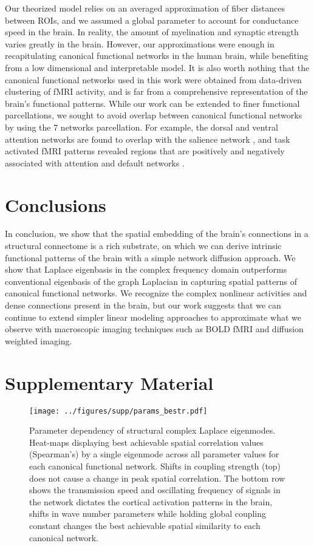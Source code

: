 \documentclass{article}
\begin{document}
Our theorized model relies on an averaged approximation of fiber distances between ROIs, and we assumed a global parameter to account for conductance speed in the brain. In reality, the amount of myelination and synaptic strength varies greatly in the brain. However, our approximations were enough in recapitulating canonical functional networks in the human brain, while benefiting from a low dimensional and interpretable model. It is also worth nothing that the canonical functional networks used in this work were obtained from data-driven clustering of fMRI activity, and is far from a comprehensive representation of the brain's functional patterns. While our work can be extended to finer functional parcellations, we sought to avoid overlap between canonical functional networks by using the 7 networks parcellation. For example, the dorsal and ventral attention networks are found to overlap with the salience network \cite{seeley_dissociable_2007}, and task activated fMRI patterns revealed regions that are positively and negatively associated with attention and default networks \cite{fox_human_2005}. 

\section{Conclusions}
In conclusion, we show that the spatial embedding of the brain's connections in a structural connectome is a rich substrate, on which we can derive intrinsic functional patterns of the brain with a simple network diffusion approach. We show that Laplace eigenbasis in the complex frequency domain outperforms conventional eigenbasis of the graph Laplacian in capturing spatial patterns of canonical functional networks. We recognize the complex nonlinear activities and dense connections present in the brain, but our work suggests that we can continue to extend simpler linear modeling approaches to approximate what we observe with macroscopic imaging techniques such as BOLD fMRI and diffusion weighted imaging. 

\clearpage
\section{Supplementary Material}
\renewcommand{\thefigure}{S\arabic{figure}}
\renewcommand\thetable{S\arabic{table}}
\setcounter{figure}{0}

\begin{figure}[ht!]
\centering
\texttt{[image: ../figures/supp/params\_bestr.pdf]}
\caption{Parameter dependency of structural complex Laplace eigenmodes. Heat-maps displaying best achievable spatial correlation values (Spearman's) by a single eigenmode across all parameter values for each canonical functional network. Shifts in coupling strength (top) does not cause a change in peak spatial correlation. The bottom row shows the transmission speed and oscillating frequency of signals in the network dictates the cortical activation patterns in the brain, shifts in wave number parameters while holding global coupling constant changes the best achievable spatial similarity to each canonical network.}
\label{fig:figS1}
\end{figure}
\end{document}
